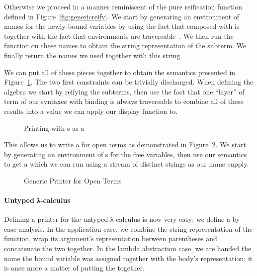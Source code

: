 
Otherwise we proceed in a manner reminiscent of the pure reification function
defined in Figure~\ref{fig:genericreify}. We start by generating an environment
of names for the newly-bound variables by using the fact that  composed
with  is  together with the fact that environments are
traversable~\cite{mcbride_paterson_2008}. We then run the  function
on these names to obtain the string representation of the subterm. We finally
return the names we used together with this string.


We can put all of these pieces together to obtain the  semantics
presented in Figure~\ref{fig:genericprinting}.
The two first constraints can be trivially discharged. When defining the
algebra we start by reifying the subterms, then use the fact that  one ``layer''
of term of our syntaxes with binding is always traversable to combine all of
these results into a value we can apply our display function to.

\begin{figure}[h]
\caption{Printing with s as a }\label{fig:genericprinting}
\end{figure}

This allows us to write a  for open terms as demonstrated in
Figure~\ref{fig:genericprint}. We start by generating
an environment of s for the free variables, then use our semantics
to get a  which we can run using a stream  of distinct
strings as our name supply.

\begin{figure}[h]
\caption{Generic Printer for Open Terms}\label{fig:genericprint}
\end{figure}


\paragraph{Untyped λ-calculus} Defining a printer for the untyped
λ-calculus is now very easy: we define a  by case analysis.
In the application case, we combine the string representation of the
function, wrap its argument's representation between parentheses and
concatenate the two together. In the lambda abstraction case, we are
handed the name the bound variable was assigned together with the body's
representation; it is once more a matter of putting the 
together.

